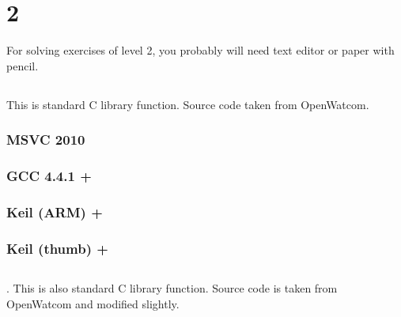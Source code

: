 \chapter{ 2}

{For solving exercises of level 2, you probably will need text editor or paper with pencil}.

\section{}

{This is standard C library function. Source code taken from OpenWatcom}.

\subsection{MSVC 2010}



\subsection{GCC 4.4.1 + \Othree}



\subsection{Keil (ARM) + \Othree}



\subsection{Keil (thumb) + \Othree}



\section{}

. 
{This is also standard C library function. Source code is taken from OpenWatcom and modified slightly}.

